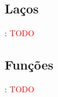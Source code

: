 \subsection{Laços}


\begin{frame}{\insertsection: \insertsubsection}
  \textcolor{red}{TODO}
\end{frame}


\subsection{Funções}


\begin{frame}{\insertsection: \insertsubsection}
  \textcolor{red}{TODO}
\end{frame}
